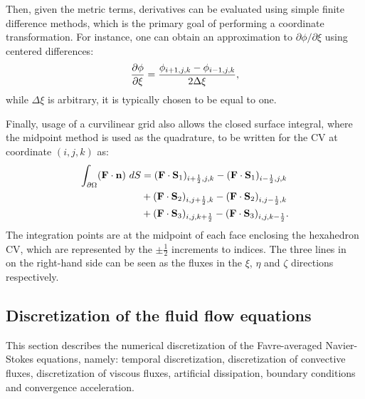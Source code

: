 Then, given the metric terms, derivatives can be evaluated using simple finite difference methods, which is the primary goal of performing a coordinate transformation. For instance, one can obtain an approximation to $\partial \phi / \partial \xi$ using centered differences:
\begin{equation*}
     \frac{\partial \phi}{\partial \xi}  = \frac{\phi_{i+1,j,k} - \phi_{i-1,j,k}}{2\Delta \xi},
\end{equation*}
while $\Delta \xi$ is arbitrary, it is typically chosen to be equal to one.

Finally, usage of a curvilinear grid also allows the closed surface integral, where the midpoint method is used as the quadrature, to be written for the CV at coordinate $(i,j,k)$ as:
\begin{align}
    \begin{split}
    \int_{\partial \Omega} (\mathbf{F}\cdot\mathbf{n})~dS &=
        (\mathbf{F}\cdot \mathbf{S}_1)_{i+\frac{1}{2},j,k}
      - (\mathbf{F}\cdot \mathbf{S}_1)_{i-\frac{1}{2},j,k} \\
      &+ (\mathbf{F}\cdot \mathbf{S}_2)_{i,j+\frac{1}{2},k}
      - (\mathbf{F}\cdot \mathbf{S}_2)_{i,j-\frac{1}{2},k} \\
      &+ (\mathbf{F}\cdot \mathbf{S}_3)_{i,j,k+\frac{1}{2}}
      - (\mathbf{F}\cdot \mathbf{S}_3)_{i,j,k-\frac{1}{2}}.
    \end{split}
    \label{eq:synflux}
\end{align}
The integration points are at the midpoint of each face enclosing the hexahedron CV, which are represented by the $\pm \frac{1}{2}$ increments to indices. The three lines in~ on the right-hand side can be seen as the fluxes in the $\xi$, $\eta$ and $\zeta$ directions respectively.
%
\subsection{Discretization of the fluid flow equations}
\label{sec:synns}
%
This section describes the numerical discretization of the Favre-averaged Navier-Stokes equations, namely: temporal discretization, discretization of convective fluxes, discretization of viscous fluxes, artificial dissipation, boundary conditions and convergence acceleration.
%
